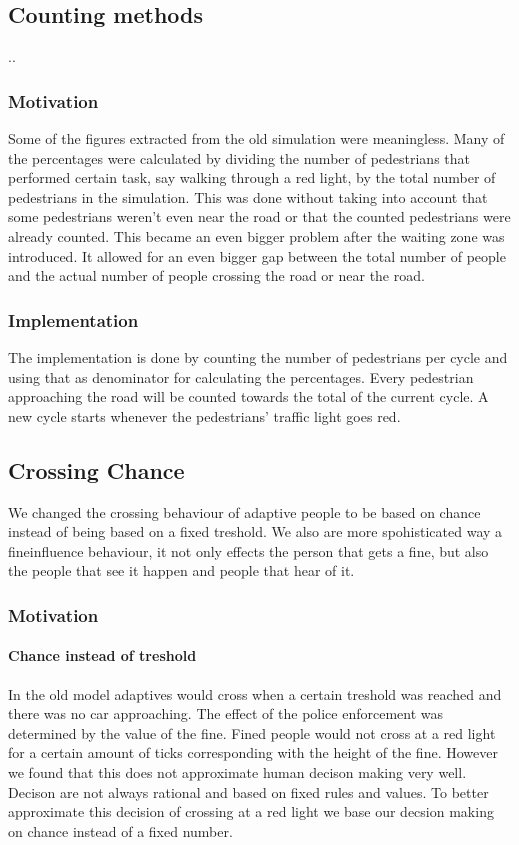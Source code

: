 \documentclass[a4paper]{article}
\begin{document}
\subsection{Counting methods}
..

\subsubsection{Motivation}
Some of the figures extracted from the old simulation were meaningless. Many of the percentages were calculated by dividing the number of pedestrians that performed certain task, say walking through a red light, by the total number of pedestrians in the simulation. This was done without taking into account that some pedestrians weren't even near the road or that the counted pedestrians were already counted.
This became an even bigger problem after the waiting zone was introduced. It allowed for an even bigger gap between the total number of people and the actual number of people crossing the road or near the road.

\subsubsection{Implementation}
The implementation is done by counting the number of pedestrians per cycle and using that as denominator for calculating the percentages. Every pedestrian approaching the road will be counted towards the total of the current cycle. A new cycle starts whenever the pedestrians' traffic light goes red.


\subsection{Crossing Chance}
We changed the crossing behaviour of adaptive people to be based on chance instead of being based on a fixed treshold. We also are more spohisticated way a fineinfluence behaviour, it not only effects the person that gets a fine, but also the people that see it happen and people that hear of it.

\subsubsection{Motivation}

\paragraph{Chance instead of treshold}
In the old model adaptives would cross when a certain treshold was reached and there was no car approaching. The effect of the police enforcement was determined by the value of the fine. Fined people would not cross at a red light for a certain amount of ticks corresponding with the height of the fine. However we found that this does not approximate human decison making very well. Decison are not always rational and based on fixed rules and values. To better approximate this decision of crossing at a red light we base our decsion making on chance instead of a fixed number. 
\end{document}
